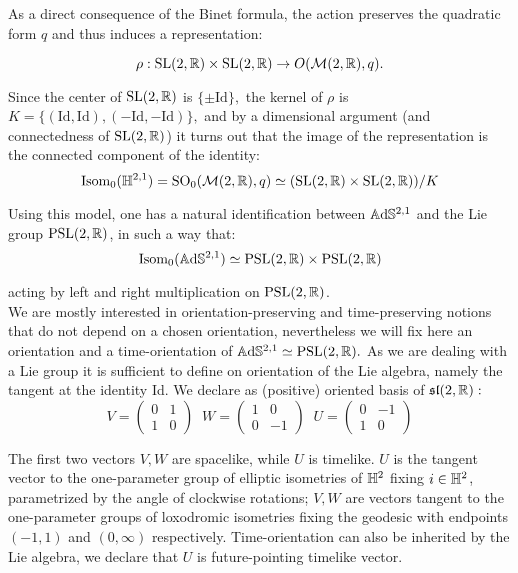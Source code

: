 As a direct consequence of the Binet formula, the action preserves the quadratic form $q$    and thus induces a representation: 

\[ \rho:\text{SL}(2,\mathbb{R})\times \text{SL}(2,\mathbb{R})\to O(\mathcal{M}(2,\mathbb{R}),q). \]

Since the center of $\text{SL}(2,\mathbb{R})$ is $\{\pm \text{Id}\},$ the kernel of $\rho$ is $K=\{(\text{Id},\text{Id}),(-\text{Id},-\text{Id})\},$ and by a dimensional argument (and connectedness of $\text{SL}(2,\mathbb{R})$) it turns out that the image of the representation is the connected component of the identity: 
\[
    \text{Isom}_0(\mathbb{H}^{2,1})=\text{SO}_0(\mathcal{M}(2,\mathbb{R}),q)\simeq (\text{SL}(2,\mathbb{R})\times \text{SL}(2,\mathbb{R}))/K
\]
    
Using this model, one has a natural identification between $\mathbb{A}\mathrm{d}\mathbb{S}^{2,1}$ and the Lie group $\text{PSL}(2,\mathbb{R})$, in such a way that: 
\begin{equation}\label{isomiso}
    \text{Isom}_0(\mathbb{A}\mathrm{d}\mathbb{S}^{2,1})\simeq \text{PSL}(2,\mathbb{R})\times\text{PSL}(2,\mathbb{R})
\end{equation}
    
acting by left and right multiplication on $\text{PSL}(2,\mathbb{R})$.\\ We are mostly interested in orientation-preserving and time-preserving notions that do not depend on a chosen orientation, nevertheless we will fix here an orientation and a time-orientation of $\mathbb{A}\mathrm{d}\mathbb{S}^{2,1}\simeq\text{PSL}(2,\mathbb{R}).$ As we are dealing with a Lie group it is sufficient to define on orientation of the Lie algebra, namely the tangent at the identity Id. We declare as (positive) oriented basis of $\mathfrak{sl}(2,\mathbb{R}):$ 
\begin{equation}\label{tangent}
V=\begin{pmatrix}
  0 & 1 \\ 1 & 0
\end{pmatrix}\;\;
W=\begin{pmatrix}
1 & 0 \\ 0 & -1
\end{pmatrix}
\;\;
U=\begin{pmatrix}
0 & -1 \\ 1 & 0
\end{pmatrix}
\end{equation}

The first two vectors $V,W$ are spacelike, while $U$ is timelike. $U$ is the tangent vector to the one-parameter group of elliptic isometries of $\mathbb{H}^2$ fixing $i\in\mathbb{H}^2$, parametrized by the angle of clockwise rotations; $V,W$ are vectors tangent to the one-parameter groups of loxodromic isometries fixing the geodesic with endpoints $(-1,1)$ and $(0,\infty)$ respectively. Time-orientation can also be inherited by the Lie algebra, we declare that $U$ is future-pointing timelike vector. \\

